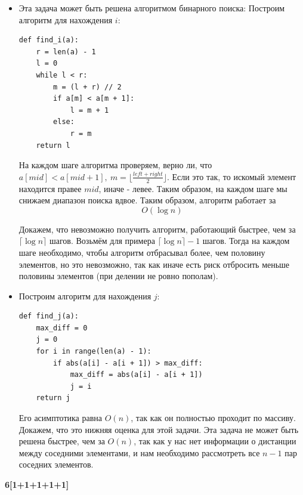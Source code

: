 \documentclass{article}
\begin{document}
\begin{itemize}
    \item Эта задача может быть решена алгоритмом
          бинарного поиска:
          Построим алгоритм для нахождения $i$:
          \begin{lstlisting}
def find_i(a):
    r = len(a) - 1
    l = 0
    while l < r:
        m = (l + r) // 2
        if a[m] < a[m + 1]:
            l = m + 1
        else:
            r = m
    return l
          \end{lstlisting}

          На каждом шаге
          алгоритма проверяем, верно ли, что
          $a[mid] < a[mid + 1], \ m = \lfloor \frac{left + right}{2} \rfloor$.
          Если это так, то искомый элемент находится правее
          $mid$, иначе - левее. Таким образом, на каждом шаге
          мы снижаем диапазон поиска вдвое. Таким образом,
          алгоритм работает за
          \[
              O(\log n)
          \]

          Докажем, что невозможно получить
          алгоритм, работающий быстрее, чем за
          $\lceil \log n \rceil$ шагов. Возьмём
          для примера $\lceil \log n \rceil - 1$
          шагов. Тогда на каждом шаге необходимо,
          чтобы алгоритм отбрасывал более, чем половину
          элементов, но это невозможно, так как
          иначе есть риск отбросить меньше половины
          элементов (при делении не ровно пополам).

    \item
          Построим алгоритм для нахождения $j$:
          \begin{lstlisting}
def find_j(a):
    max_diff = 0
    j = 0
    for i in range(len(a) - 1):
        if abs(a[i] - a[i + 1]) > max_diff:
            max_diff = abs(a[i] - a[i + 1])
            j = i
    return j
          \end{lstlisting}

          Его асимптотика равна $O(n)$, так как
          он полностью проходит по массиву.
          Докажем, что это нижняя оценка для этой задачи.
          Эта задача не может быть решена быстрее,
          чем за $O(n)$, так как у нас нет информации
          о дистанции между соседними элементами, и
          нам необходимо рассмотреть все $n-1$ пар
          соседних элементов.

\end{itemize}

\medskip

\textbf{6[1+1+1+1+1]}
\end{document}
